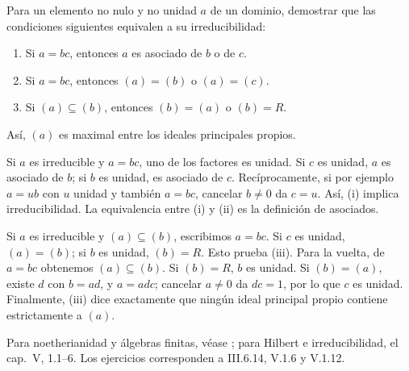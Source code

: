 \begin{ejer}\label{ejer:C15-irreducible}
Para un elemento no nulo y no unidad $a$ de un dominio, demostrar que las condiciones siguientes equivalen a su irreducibilidad:
\begin{enumerate}[label=\textup{(\roman*)}]
\item Si $a=bc$, entonces $a$ es asociado de $b$ o de $c$.
\item Si $a=bc$, entonces $(a)=(b)$ o $(a)=(c)$.
\item Si $(a)\subseteq(b)$, entonces $(b)=(a)$ o $(b)=R$.
\end{enumerate}
Así, $(a)$ es maximal entre los ideales principales propios.
\end{ejer}
\begin{sol}
Si $a$ es irreducible y $a=bc$, uno de los factores es unidad. Si $c$ es unidad, $a$ es asociado de $b$; si $b$ es unidad, es asociado de $c$. Recíprocamente, si por ejemplo $a=ub$ con $u$ unidad y también $a=bc$, cancelar $b\ne0$ da $c=u$. Así, (i) implica irreducibilidad. La equivalencia entre (i) y (ii) es la definición de asociados.

Si $a$ es irreducible y $(a)\subseteq(b)$, escribimos $a=bc$. Si $c$ es unidad, $(a)=(b)$; si $b$ es unidad, $(b)=R$. Esto prueba (iii). Para la vuelta, de $a=bc$ obtenemos $(a)\subseteq(b)$. Si $(b)=R$, $b$ es unidad. Si $(b)=(a)$, existe $d$ con $b=ad$, y $a=adc$; cancelar $a\ne0$ da $dc=1$, por lo que $c$ es unidad. Finalmente, (iii) dice exactamente que ningún ideal principal propio contiene estrictamente a $(a)$.
\end{sol}

\begin{obs}
Para noetherianidad y álgebras finitas, véase \citet[cap.~III, 6.4--9]{aluffi2009}; para Hilbert e irreducibilidad, el cap.~V, 1.1--6. Los ejercicios corresponden a III.6.14, V.1.6 y V.1.12.
\end{obs}
